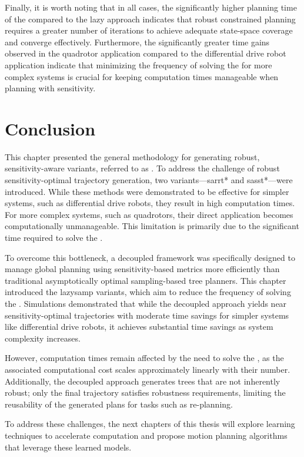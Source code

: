 Finally, it is worth noting that in all cases, the significantly higher planning time of the  compared to the lazy approach indicates that robust constrained planning requires a greater number of iterations to achieve adequate state-space coverage and converge effectively.
Furthermore, the significantly greater time gains observed in the quadrotor application compared to the differential drive robot application indicate that minimizing the frequency of solving the  for more complex systems is crucial for keeping computation times manageable when planning with sensitivity.

\section{Conclusion}\label{sec:concl}

This chapter presented the general methodology for generating robust, sensitivity-aware variants, referred to as . 
To address the challenge of robust sensitivity-optimal trajectory generation, two variants—\gls{sarrt*} and \gls{sasst*}—were introduced. While these methods were demonstrated to be effective for simpler systems, such as differential drive robots, they result in high computation times. 
For more complex systems, such as quadrotors, their direct application becomes computationally unmanageable.
This limitation is primarily due to the significant time required to solve the .

To overcome this bottleneck, a decoupled framework was specifically designed to manage global planning using sensitivity-based metrics more efficiently than traditional asymptotically optimal sampling-based tree planners. 
This chapter introduced the \gls{lazysamp} variants, which aim to reduce the frequency of solving the . 
Simulations demonstrated that while the decoupled approach yields near sensitivity-optimal trajectories with moderate time savings for simpler systems like differential drive robots, it achieves substantial time savings as system complexity increases.

However, computation times remain affected by the need to solve the , as the associated computational cost scales approximately linearly with their number.
Additionally, the decoupled approach generates trees that are not inherently robust; only the final trajectory satisfies robustness requirements, limiting the reusability of the generated plans for tasks such as re-planning.

To address these challenges, the next chapters of this thesis will explore learning techniques to accelerate  computation and propose motion planning algorithms that leverage these learned models.